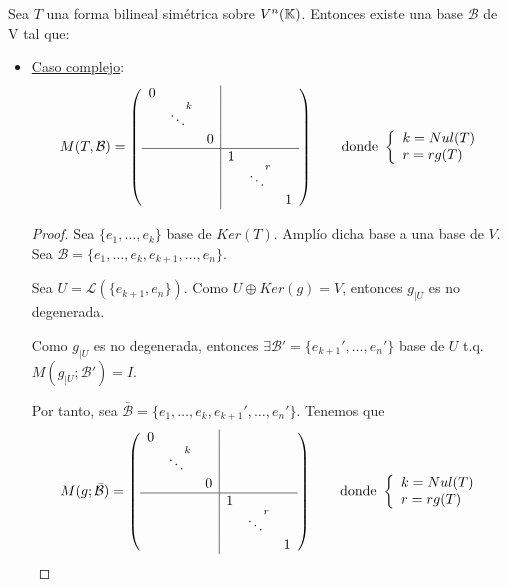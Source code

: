 \begin{teo}
    Sea $T$ una forma bilineal simétrica sobre $V^n(\mathbb{K})$. Entonces existe una base $\mathcal{B}$ de V tal que:
    \begin{itemize}
        \item \underline{Caso complejo}:
        \begin{equation*}
            M(T,\mathcal{B}) = \left( \begin{array}{ccc|ccc}
                0&&&&& \\
                &\ddots ^k&&&& \\
                &&0&&& \\ \hline
                &&&1&& \\
                &&&&\ddots^r& \\
                &&&&&1 \\
            \end{array}\right)  \qquad \text{donde } \left\{\begin{array}{l}
                 k=Nul(T) \\
                 r=rg(T)
            \end{array}\right.
        \end{equation*}

        \begin{proof}
            Sea $\{e_1, \dots, e_k\}$ base de $Ker(T)$. Amplío dicha base a una base de $V$. Sea $\mathcal{B} = \{e_1, \dots, e_k, e_{k+1}, \dots, e_n\}$.

            Sea $U=\mathcal{L}(\{e_{k+1}, e_n\})$. Como $U\oplus Ker(g)=V$, entonces $g_{\left|U \right.}$ es no degenerada.

            Como $g_{\left|U \right.}$ es no degenerada, entonces $\exists \mathcal{B}' = \{e_{k+1}', \dots, e_{n}'\}$ base de $U$ t.q. $M(g_{\left|U \right.}; \mathcal{B}') = I$.

            Por tanto, sea $\bar{\mathcal{B}} = \{e_1, \dots, e_k, e_{k+1}', \dots, e_n'\}$. Tenemos que
            \begin{equation*}
                    M(g;\bar{\mathcal{B}}) = \left( \begin{array}{ccc|ccc}
                    0&&&&& \\
                    &\ddots ^k&&&& \\
                    &&0&&& \\ \hline
                    &&&1&& \\
                    &&&&\ddots^r& \\
                    &&&&&1 \\
                \end{array}\right)  \qquad \text{donde } \left\{\begin{array}{l}
                     k=Nul(T) \\
                     r=rg(T)
                \end{array}\right.
            \end{equation*}
        \end{proof}


\end{itemize}
\end{teo}
